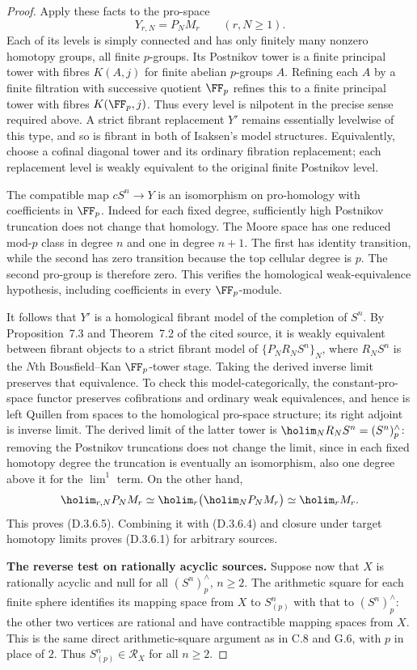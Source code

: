 \begin{proof}
Apply these facts to the pro-space
\[
                    Y_{r,N}=P_NM_r\qquad(r,N\geq1).
\]
Each of its levels is simply connected and has only
finitely many nonzero homotopy groups, all finite
$p$-groups. Its Postnikov tower is a finite principal
tower with fibres $K(A,j)$ for finite abelian $p$-groups
$A$. Refining each $A$ by a finite filtration with
successive quotient $\FF_p$ refines this to a finite
principal tower with fibres $K(\FF_p,j)$. Thus every level
is nilpotent in the precise sense required above.
A strict fibrant replacement $Y'$ remains essentially
levelwise of this type, and so is fibrant in both of
Isaksen's model structures. Equivalently, choose a
cofinal diagonal tower and its ordinary fibration
replacement; each replacement level is weakly equivalent
to the original finite Postnikov level.

The compatible map $cS^n\to Y$ is an isomorphism on
pro-homology with coefficients in $\FF_p$. Indeed for
each fixed degree, sufficiently high Postnikov truncation
does not change that homology. The Moore space has one
reduced mod-$p$ class in degree $n$ and one in degree
$n+1$. The first has identity transition, while the second
has zero transition because the top cellular degree is $p$.
The second pro-group is therefore zero. This verifies the
homological weak-equivalence hypothesis, including
coefficients in every $\FF_p$-module.

It follows that $Y'$ is a homological fibrant model of the
completion of $S^n$. By Proposition~7.3 and Theorem~7.2
of the cited source, it is weakly equivalent between
fibrant objects to a strict fibrant model of
$\{P_NR_NS^n\}_N$, where $R_NS^n$ is the $N$th
Bousfield--Kan $\FF_p$-tower stage.
Taking the derived inverse limit preserves that
equivalence. To check this model-categorically, the
constant-pro-space functor preserves cofibrations and
ordinary weak equivalences, and hence is left Quillen
from spaces to the homological pro-space structure;
its right adjoint is inverse limit.
The derived limit of the latter tower is
$\holim_NR_NS^n=(S^n)^{\wedge}_p$: removing the
Postnikov truncations does not change the limit, since
in each fixed homotopy degree the truncation is eventually
an isomorphism, also one degree above it for the
$\lim^1$ term.
On the other hand,
\[
 \holim_{r,N}P_NM_r
       \simeq\holim_r\bigl(\holim_NP_NM_r\bigr)
       \simeq\holim_rM_r.
 \]
This proves (D.3.6.5). Combining it with (D.3.6.4) and
closure under target homotopy limits proves (D.3.6.1)
for arbitrary sources.

\medskip\noindent
\textbf{The reverse test on rationally acyclic sources.}
Suppose now that $X$ is rationally acyclic and null for
all $(S^n)^{\wedge}_p$, $n\geq2$. The arithmetic square
for each finite sphere identifies its mapping space
from $X$ to $S^n_{(p)}$ with that to $(S^n)^{\wedge}_p$:
the other two vertices are rational and have contractible
mapping spaces from $X$. This is the same direct
arithmetic-square argument as in C.8 and G.6, with $p$
in place of $2$. Thus $S^n_{(p)}\in\mathcal R_X$ for
all $n\geq2$.


\end{proof}
